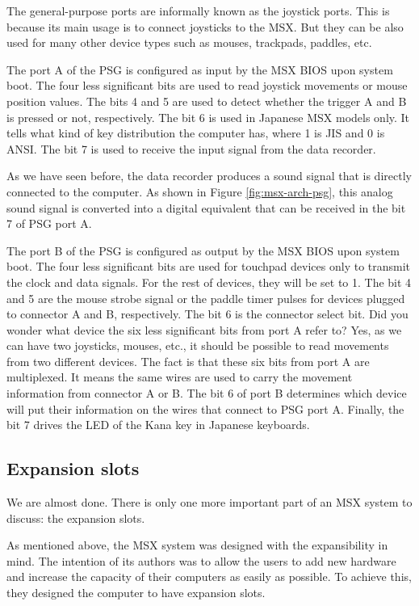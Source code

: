 The general-purpose ports are informally known as the joystick ports. This is because its main usage is to connect joysticks to the MSX. But they can be also used for many other device types such as mouses, trackpads, paddles, etc. 

The port A of the PSG is configured as input by the MSX BIOS upon system boot. The four less significant bits are used to read joystick movements or mouse position values. The bits 4 and 5 are used to detect whether the trigger A and B is pressed or not, respectively. The bit 6 is used in Japanese MSX models only. It tells what kind of key distribution the computer has, where 1 is JIS and 0 is ANSI. The bit 7 is used to receive the input signal from the data recorder. 

As we have seen before, the data recorder produces a sound signal that is directly connected to the computer. As shown in Figure \ref{fig:msx-arch-psg}, this analog sound signal is converted into a digital equivalent that can be received in the bit 7 of PSG port A. 

The port B of the PSG is configured as output by the MSX BIOS upon system boot. The four less significant bits are used for touchpad devices only to transmit the clock and data signals. For the rest of devices, they will be set to 1. The bit 4 and 5 are the mouse strobe signal or the paddle timer pulses for devices plugged to connector A and B, respectively. The bit 6 is the connector select bit. Did you wonder what device the six less significant bits from port A refer to? Yes, as we can have two joysticks, mouses, etc., it should be possible to read movements from two different devices. The fact is that these six bits from port A are multiplexed. It means the same wires are used to carry the movement information from connector A or B. The bit 6 of port B determines which device will put their information on the wires that connect to PSG port A. Finally, the bit 7 drives the LED of the Kana key in Japanese keyboards.

\subsection{Expansion slots}

We are almost done. There is only one more important part of an MSX system to discuss: the expansion slots. 

As mentioned above, the MSX system was designed with the expansibility in mind. The intention of its authors was to allow the users to add new hardware and increase the capacity of their computers as easily as possible. To achieve this, they designed the computer to have expansion slots. 

